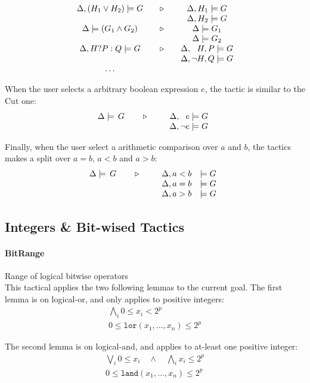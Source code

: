 \[
\begin{array}{c@{\quad\quad}c@{\quad\quad}c}
  \Delta,(H_1\vee H_2)\models G & \triangleright &
     \Delta,H_1 \models G \\
  && \Delta,H_2 \models G \\
  \Delta\models(G_1\wedge G_2) & \triangleright &
     \Delta\models G_1 \\
  && \Delta\models G_2 \\
  \Delta,H?P:Q\models G & \triangleright &
     \Delta,\phantom{\neg}H,P\models G \\
  && \Delta,\neg H,Q\models G \\
  \ldots
\end{array}
\]

When the user selects a arbitrary boolean expression $e$, the tactic is similar to the Cut one:
\[\TACTIC{\Delta\models\,G}{%
\begin{array}[t]{l}
\Delta,\phantom{\neg}e\models G \\
\Delta,\neg e\models G
\end{array}} \]

Finally, when the user select a arithmetic comparison over $a$ and $b$,
the tactics makes a split over $a=b$, $a<b$ and $a>b$:
\[\TACTIC{\Delta\models\,G}{%
\begin{array}[t]{ll}
\Delta,a<b&\models G \\
\Delta,a=b&\models G \\
\Delta,a>b&\models G
\end{array}} \]

\subsection{Integers \& Bit-wised Tactics}

\paragraph{BitRange} Range of logical bitwise operators \\
This tactical applies the two following lemmas to the current goal.
The first lemma is on logical-or, and only applies to positive integers:
\[
\begin{array}{c}
  \bigwedge_i 0 \leq x_i < 2^p
  \\\hline
  0 \leq \mathtt{lor}(x_1,\ldots,x_n) \leq 2^p
\end{array}
\]

The second lemma is on logical-and, and applies to at-least one positive integer:
\[
\begin{array}{c}
  \bigvee_i 0 \leq x_i \quad\wedge\quad \bigwedge_i x_i \leq 2^p
  \\\hline
  0 \leq \mathtt{land}(x_1,\ldots,x_n) \leq 2^p
\end{array}
\]

